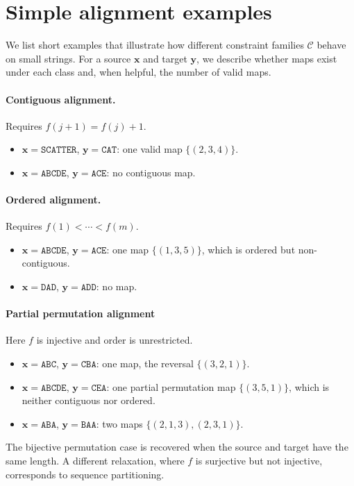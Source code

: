 \newpage
\section{Simple alignment examples}

We list short examples that illustrate how different constraint families
$\mathcal{C}$ behave on small strings. For a source $\mathbf{x}$ and target
$\mathbf{y}$, we describe whether maps exist under each class and, when
helpful, the number of valid maps.

\paragraph{Contiguous alignment.}
Requires $f(j{+}1)=f(j)+1$.
\begin{itemize}
    \item $\mathbf{x}=\texttt{SCATTER}$, $\mathbf{y}=\texttt{CAT}$:
    one valid map $\{(2,3,4)\}$.
    \item $\mathbf{x}=\texttt{ABCDE}$, $\mathbf{y}=\texttt{ACE}$:
    no contiguous map.
\end{itemize}

\paragraph{Ordered alignment.}
Requires $f(1)<\cdots<f(m)$.
\begin{itemize}
    \item $\mathbf{x}=\texttt{ABCDE}$, $\mathbf{y}=\texttt{ACE}$:
    one map $\{(1,3,5)\}$, which is ordered but non-contiguous.
    \item $\mathbf{x}=\texttt{DAD}$, $\mathbf{y}=\texttt{ADD}$:
    no map.
\end{itemize}

\paragraph{Partial permutation alignment}
Here $f$ is injective and order is unrestricted.
\begin{itemize}
    \item $\mathbf{x}=\texttt{ABC}$, $\mathbf{y}=\texttt{CBA}$:
    one map, the reversal $\{(3,2,1)\}$.
    \item $\mathbf{x}=\texttt{ABCDE}$, $\mathbf{y}=\texttt{CEA}$:
    one partial permutation map $\{(3,5,1)\}$, which is neither contiguous nor ordered.
    \item $\mathbf{x}=\texttt{ABA}$, $\mathbf{y}=\texttt{BAA}$:
    two maps $\{(2,1,3), (2,3,1)\}$.
\end{itemize}
The bijective permutation case is recovered when the source and target have the same length. A different relaxation, where $f$ is surjective but not injective, corresponds to sequence partitioning.

